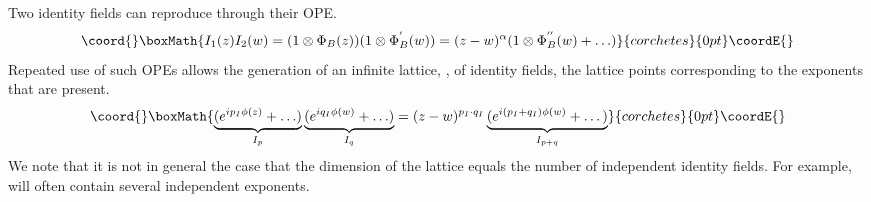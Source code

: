 \documentclass[a4paper,a4paper]{article}
\begin{document}
Two identity fields can reproduce through their OPE.
\begin{displaymath}\coord{}\boxMath{
I_1(z)I_2(w) = (1\otimes \Phi_B(z))(1 \otimes \Phi_B^{'}(w)) = (z-w)^{\alpha}(1 \otimes \Phi_B^{''}(w) + \ldots )
}{corchetes}{0pt}\coordE{}\end{displaymath}
Repeated use of such OPEs allows the generation of an infinite lattice, \coordHE{}, of identity fields, the lattice points
corresponding to the exponents that are present. 
\begin{displaymath}\coord{}\boxMath{
\underbrace{(e^{ip_I\phi(z)} + \ldots)}_{I_p}\underbrace{(e^{iq_I\phi(w)} + \ldots )}_{I_q} = 
(z-w)^{p_I \cdot q_I}\underbrace{(e^{i(p_I + q_I)\phi(w)} + \dots )}_{I_{p+q}}
}{corchetes}{0pt}\coordE{}\end{displaymath}
We note that it is not in general the case
that the dimension of the lattice \coordHE{} equals the number of independent identity fields. For example, \coordHE{} will
often contain several independent exponents. 
\end{document}
